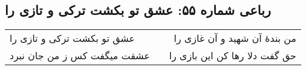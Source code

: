 \begin{center}
\section*{رباعی شماره ۵۵: عشق تو بکشت ترکی و تازی را}
\label{sec:0055}
\begin{longtable}{l p{0.5cm} r}
عشق تو بکشت ترکی و تازی را
&&
من بندهٔ آن شهید و آن غازی را
\\
عشقت میگفت کس ز من جان نبرد
&&
حق گفت دلا رها کن این بازی را
\\
\end{longtable}
\end{center}
